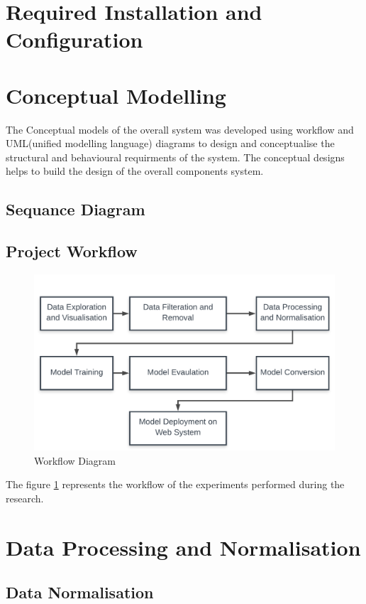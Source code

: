 \section{Required Installation and Configuration}

\pagebreak
\section{Conceptual Modelling}
The Conceptual models of the overall system was developed using workflow 
and UML(unified modelling language) diagrams to design and conceptualise
the structural and behavioural requirments of the system. The conceptual designs 
helps to build the design of the overall components system.
\subsection{Sequance Diagram}

\subsection{Project Workflow}
\begin{figure}[!htp]
    \centering
    \includegraphics[width=\textwidth]{Images/worflow.png}
    \caption{Workflow Diagram}
    \label{figure:workflow}
\end{figure}

The figure \ref{figure:workflow} represents the workflow of the experiments 
performed during the research.
\pagebreak
\section{Data Processing and Normalisation}

\subsection{Data Normalisation}


